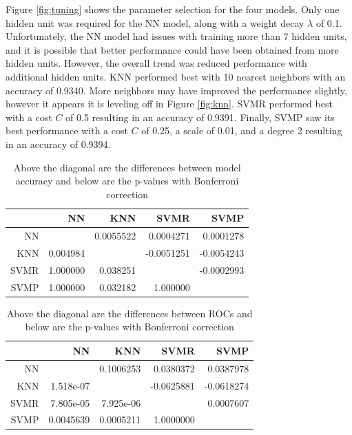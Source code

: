 \documentclass[twoside,11pt]{article}
\begin{document}
Figure \ref{fig:tuning} shows the parameter selection for the four models.
Only one hidden unit was required for the NN model, along with a weight decay
$\lambda$ of 0.1.  Unfortunately, the NN model had issues with training more
than 7 hidden units, and it is possible that better performance could have been
obtained from more hidden units.  However, the overall trend was reduced
performance with additional hidden units.  KNN performed best with 10 nearest
neighbors with an accuracy of 0.9340.  More neighbors may have improved the
performance slightly, however it appears it is leveling off in Figure
\ref{fig:knn}.  SVMR performed best with a cost $C$ of 0.5 resulting in an
accuracy of 0.9391.  Finally, SVMP saw its best performance with a cost $C$ of
0.25, a scale of 0.01, and a degree 2 resulting in an accuracy of 0.9394.  

\begin{table}[ht]
\centering
\caption{Above the diagonal are the differences between model accuracy and
  below are the p-values with Bonferroni correction}
\begin{tabular}{rrrrr}
  \hline
 & NN & KNN & SVMR & SVMP \\ 
  \hline
NN &  &  0.0055522 &  0.0004271 &  0.0001278 \\ 
  KNN & 0.004984 &  & -0.0051251 & -0.0054243 \\ 
  SVMR & 1.000000 & 0.038251 &  & -0.0002993 \\ 
  SVMP & 1.000000 & 0.032182 & 1.000000 &  \\ 
   \hline
\end{tabular}
\label{tab:Accuracypvalues}
\end{table}

\begin{table}[htbp]
\centering
\caption{Above the diagonal are the differences between ROCs and below are the
  p-values with Bonferroni correction}
\begin{tabular}{rrrrr}
  \hline
 & NN & KNN & SVMR & SVMP \\ 
  \hline
NN &  &  0.1006253 &  0.0380372 &  0.0387978 \\ 
  KNN & 1.518e-07 &  & -0.0625881 & -0.0618274 \\ 
  SVMR & 7.805e-05 & 7.925e-06 &  &  0.0007607 \\ 
  SVMP & 0.0045639 & 0.0005211 & 1.0000000 &  \\ 
   \hline
\end{tabular}
  \label{tab:ROCpvalues}
\end{table}
\end{document}
